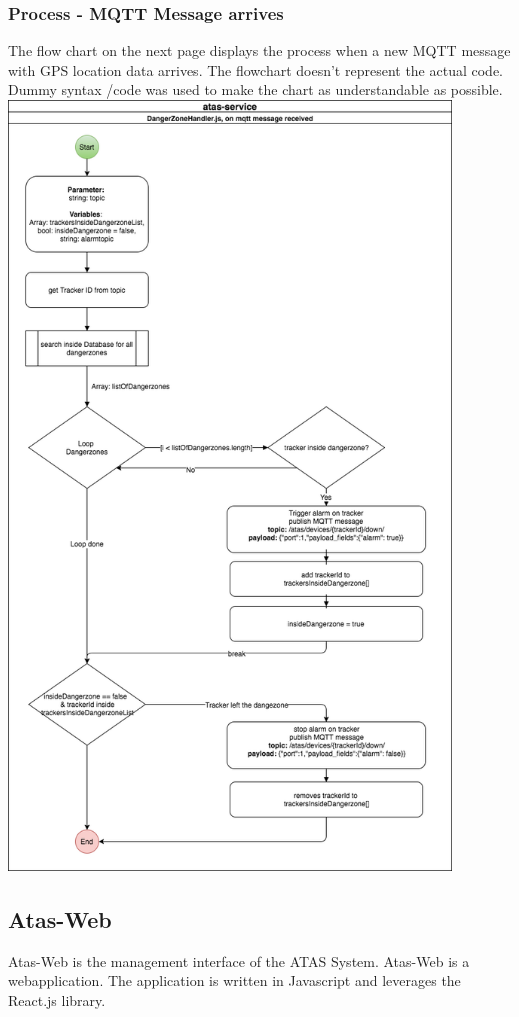 \documentclass[a4paper,11pt, oneside]{report}
\theoremstyle{definition}
\begin{document}
\subsubsection{Process - MQTT Message arrives}
The flow chart  on the next page displays the process when a new MQTT message with GPS location data arrives. The flowchart doesn't represent the actual code. Dummy syntax /code was used to make the chart as understandable as possible.
\newpage
\includegraphics[width=0.88\textwidth]{img/atas-service-process-diagramm.png}\\

\newpage
\subsection{Atas-Web}
Atas-Web is the management interface of the ATAS System. Atas-Web is a webapplication. The application is written in Javascript and leverages the React.js library.\\[0.3cm]
\end{document}
